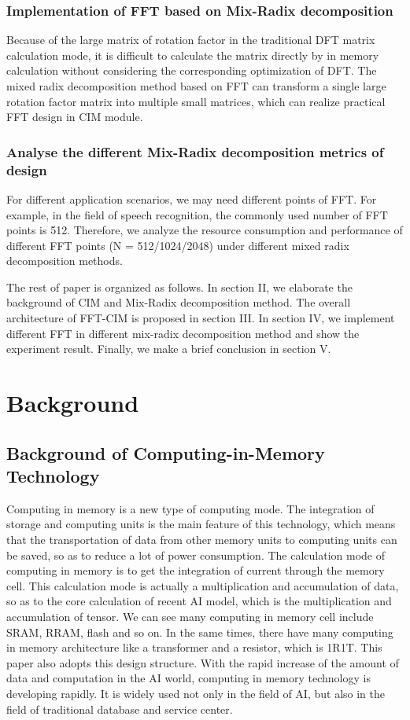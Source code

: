 \documentclass[journal]{IEEEtran}
\begin{document}
\subsubsection{Implementation of FFT based on Mix-Radix decomposition}
Because of the large matrix of rotation factor in the traditional DFT matrix calculation mode, it is difficult to calculate the matrix directly by in memory calculation without considering the corresponding optimization of DFT. The mixed radix decomposition method based on FFT can transform a single large rotation factor matrix  into multiple small matrices, which can realize practical FFT design in CIM module.
\subsubsection{Analyse the different Mix-Radix decomposition metrics of design}
For different application scenarios, we may need different points of FFT. For example, in the field of speech recognition, the commonly used number of FFT points is 512. Therefore, we analyze the resource consumption and performance of different FFT points (N = 512/1024/2048) under different mixed radix decomposition methods.

The rest of paper is organized as follows. In section II, we elaborate the background of CIM and Mix-Radix
decomposition method. The overall architecture of FFT-CIM is proposed in section III. In section IV, we
implement different FFT in different mix-radix decomposition method and show the experiment result. Finally, we make a brief conclusion in section V.

\section{Background}
\subsection{Background of Computing-in-Memory Technology}
Computing in memory is a new type of computing mode. The integration of storage and computing units is the main feature of this technology, which means that the transportation of data from other memory units to computing units can be saved, so as to reduce a lot of power consumption. The calculation mode of computing in memory is to get the integration of current through the memory cell. This calculation mode is actually a multiplication and accumulation of data, so as to the core calculation of recent AI model, which is the multiplication and accumulation of tensor. We can see many computing in memory cell include SRAM, RRAM, flash and so on. In the same times, there have many computing in memory architecture like a transformer and a resistor, which is 1R1T. This paper also adopts this design structure. With the rapid increase of the amount of data and computation in the AI world, computing in memory technology is developing rapidly. It is widely used not only in the field of AI, but also in the field of traditional database and service center.
\end{document}
